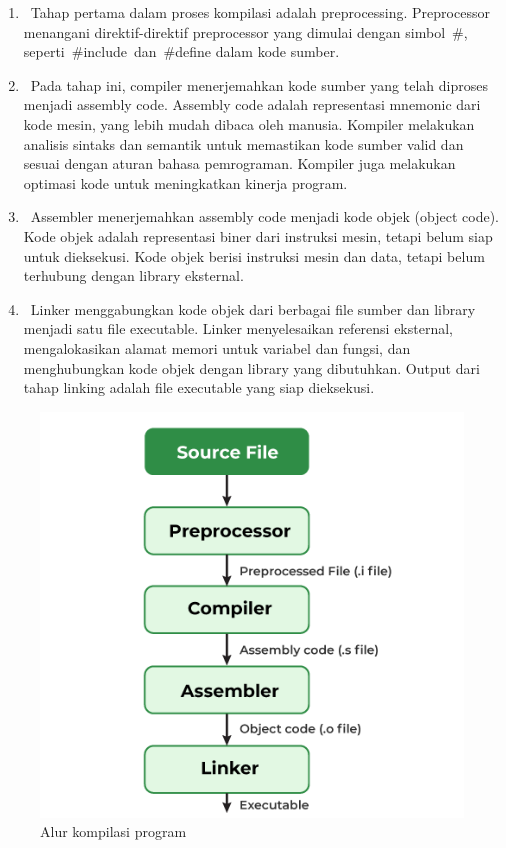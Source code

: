 \begin{enumerate}
	\item {} Tahap pertama dalam proses kompilasi adalah preprocessing. Preprocessor menangani direktif-direktif preprocessor yang dimulai dengan simbol \#, seperti \#include dan \#define dalam kode sumber.
	\item {} Pada tahap ini, compiler menerjemahkan kode sumber yang telah diproses menjadi assembly code. Assembly code adalah representasi mnemonic dari kode mesin, yang lebih mudah dibaca oleh manusia. Kompiler melakukan analisis sintaks dan semantik untuk memastikan kode sumber valid dan sesuai dengan aturan bahasa pemrograman. Kompiler juga melakukan optimasi kode untuk meningkatkan kinerja program.
	\item {} Assembler menerjemahkan assembly code menjadi kode objek (object code). Kode objek adalah representasi biner dari instruksi mesin, tetapi belum siap untuk dieksekusi. Kode objek berisi instruksi mesin dan data, tetapi belum terhubung dengan library eksternal.
	\item {} Linker menggabungkan kode objek dari berbagai file sumber dan library menjadi satu file executable. Linker menyelesaikan referensi eksternal, mengalokasikan alamat memori untuk variabel dan fungsi, dan menghubungkan kode objek dengan library yang dibutuhkan. Output dari tahap linking adalah file executable yang siap dieksekusi.
\end{enumerate}

\begin{figure}
	\centering
	\includegraphics[width=0.35\textheight]
	{assets/pics/program_compile.png}
	\caption{Alur kompilasi program}
\end{figure}


